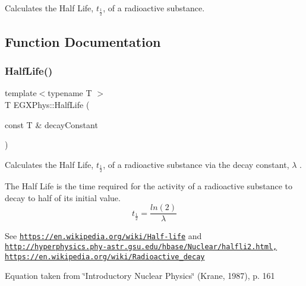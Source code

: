 Calculates the Half Life, $t_{\frac{1}{2}}$, of a radioactive substance. 

\subsection{Function Documentation}
\mbox{\label{group___e_g_x_phys-_half_life_ga21d268f154fb91c1c556bbfa7fe83ac1}} 
\subsubsection{\texorpdfstring{Half\+Life()}{HalfLife()}}
{\footnotesize\ttfamily template$<$typename T $>$ \\
T E\+G\+X\+Phys\+::\+Half\+Life (\begin{DoxyParamCaption}\item[{const T \&}]{decay\+Constant }\end{DoxyParamCaption})}



Calculates the Half Life, $t_{\frac{1}{2}}$, of a radioactive substance via the decay constant, $\lambda$ . 

The Half Life is the time required for the activity of a radioactive substance to decay to half of its initial value. \[t_{\frac{1}{2}}=\frac{ln(2)}{\lambda}\]

See \href{https://en.wikipedia.org/wiki/Half-life}{\tt https\+://en.\+wikipedia.\+org/wiki/\+Half-\/life} and \href{http://hyperphysics.phy-astr.gsu.edu/hbase/Nuclear/halfli2.html,}{\tt http\+://hyperphysics.\+phy-\/astr.\+gsu.\+edu/hbase/\+Nuclear/halfli2.\+html,} \href{https://en.wikipedia.org/wiki/Radioactive_decay}{\tt https\+://en.\+wikipedia.\+org/wiki/\+Radioactive\+\_\+decay}

Equation taken from \char`\"{}\+Introductory Nuclear Physics\char`\"{} (Krane, 1987), p. 161



